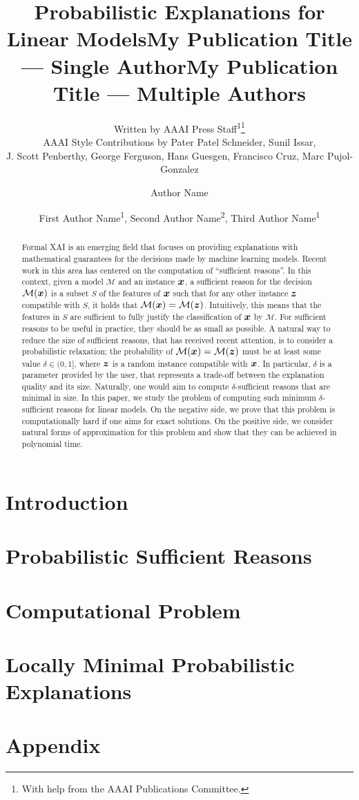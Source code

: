 \documentclass[letterpaper]{article} %
\title{Probabilistic Explanations for Linear Models}
\author{
    Written by AAAI Press Staff\textsuperscript{\rm 1}\thanks{With help from the AAAI Publications Committee.}\\
    AAAI Style Contributions by Pater Patel Schneider,
    Sunil Issar,\\
    J. Scott Penberthy,
    George Ferguson,
    Hans Guesgen,
    Francisco Cruz\equalcontrib,
    Marc Pujol-Gonzalez\equalcontrib
}
\title{My Publication Title --- Single Author}
\author {
    Author Name
}
\title{My Publication Title --- Multiple Authors}
\author {
    First Author Name\textsuperscript{\rm 1},
    Second Author Name\textsuperscript{\rm 2},
    Third Author Name\textsuperscript{\rm 1}
}
\newcommand{\M}{\mathcal{M}}
\begin{document}
\maketitle

\begin{abstract}
Formal XAI is an emerging field that focuses on providing explanations
with mathematical guarantees for the decisions made by machine
learning models. Recent work in this area has centered on the
computation of ``sufficient reasons''. In this context, given a model $\M$
and an instance ${\bm{x}}$, a sufficient reason for the decision $\M(\vx)$ is a
subset $S$ of the features of ${\bm{x}}$ such that for any other instance ${\bm{z}}$
compatible with $S$, it holds that $\M(\vx) = \M(\vz)$. Intuitively, this means
that the features in $S$ are sufficient to fully justify the
classification of ${\bm{x}}$ by $\M$.
For sufficient reasons to be useful in practice, they should be as
small as possible. A natural way to reduce the size of sufficient
reasons, that has received recent attention, is to consider a
probabilistic relaxation; the probability of $\M(\vx) = \M(\vz)$ must
be at least some value $\delta \in (0,1]$, where ${\bm{z}}$ is a random
  instance compatible with ${\bm{x}}$. In particular, $\delta$ is a
  parameter provided by the user, that represents a trade-off between
  the explanation quality and its size. Naturally, one would aim to
  compute $\delta$-sufficient reasons that are minimal in size. In this
  paper, we study the problem of computing such minimum
  $\delta$-sufficient reasons for linear models. On the negative side, we
  prove that this problem is computationally hard if one aims for
  exact solutions. On the positive side, we consider natural forms of
  approximation for this problem and show that they can be achieved in
  polynomial time.
\end{abstract}


\section{Introduction}
\label{sec-into}


\section{Probabilistic Sufficient Reasons}
\label{sec-prop-SR}


\section{Computational Problem}
\label{sec-comp-problem}


\section{Locally Minimal Probabilistic Explanations}
\label{sec-loc-min}




\newpage
\onecolumn
\appendix
\section*{Appendix}


\end{document}
